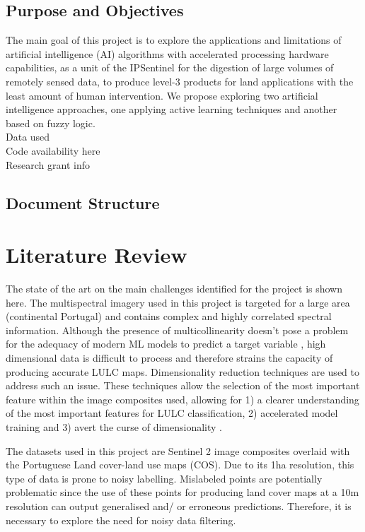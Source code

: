 \documentclass[12pt, english, openany]{book}
\begin{document}
\section{Purpose and Objectives}

The main goal of this project is to explore the applications and limitations of
artificial intelligence (AI) algorithms with accelerated processing hardware
capabilities, as a unit of the IPSentinel for the digestion of large volumes of
remotely sensed data, to produce level-3 products for land applications with
the least amount of human intervention. We propose exploring two artificial
intelligence approaches, one applying active learning techniques and another
based on fuzzy logic.
\\
Data used
\\
Code availability here
\\
Research grant info

\section{Document Structure}


\chapter{Literature Review}

The state of the art on the main challenges identified for the project is shown
here. The multispectral imagery used in this project is targeted for a large
area (continental Portugal) and contains complex and highly correlated spectral
information. Although the presence of multicollinearity doesn't pose a problem
for the adequacy of modern ML models to predict a target variable
\cite{Farrell2019}, high dimensional data is difficult to process and therefore
strains the capacity of producing accurate LULC maps. Dimensionality reduction
techniques are used to address such an issue. These techniques allow the
selection of the most important feature within the image composites used,
allowing for 1) a clearer understanding of the most important features for LULC
classification, 2) accelerated model training and 3) avert the curse of
dimensionality \cite{Ghojogh2019}.


The datasets used in this project are Sentinel 2 image composites overlaid with
the Portuguese Land cover-land use maps (COS). Due to its 1ha resolution, this
type of data is prone to noisy labelling. %
Mislabeled points are potentially problematic since the use of these points for
producing land cover maps at a 10m resolution can output generalised and/ or
erroneous predictions. Therefore, it is necessary to explore the need for noisy
data filtering.
\end{document}
